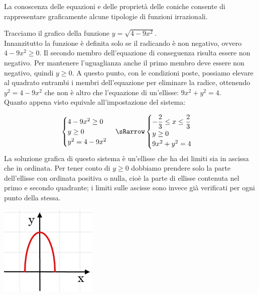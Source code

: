 La conoscenza delle equazioni e delle proprietà delle coniche consente di 
rappresentare graficamente alcune tipologie di funzioni irrazionali.\\
\begin{esempio} Tracciamo il grafico della funzione 
\(y=\sqrt{4-9x^{2}}\).\\[7pt] Innanzitutto la funzione è definita solo se il 
radicando è non negativo, ovvero \(4-9x^{2}\geq0\). Il secondo membro 
dell'equazione di conseguenza risulta essere non negativo. Per mantenere l'uguaglianza 
anche il primo membro deve essere non negativo, quindi \( y\geq 0 \). 
A questo punto, con le condizioni poste, possiamo elevare al quadrato entrambi i membri dell'equazione
per eliminare la radice, ottenendo \( y^{2}=4-9x^{2} \) che non è altro che 
l'equazione di un'ellisse: \( 9x^{2}+y^{2}=4 \).
\\[5pt]
Quanto appena visto equivale all'impostazione del sistema:\\[7pt]
\noindent \begin{minipage}{.7\textwidth}
\[\begin{cases}  4-9x^{2}\geq 0   \\ y\geq0  \\y^{2}=4-9x^{2} 
\end{cases} \sRarrow
\begin{cases}   -\dfrac{2}{3}\leq x\leq \dfrac{2}{3}   \\ y\geq0  \\ 
9x^{2}+y^{2}=4 \end{cases}\] 
La soluzione grafica di questo sistema è un'ellisse che ha 
dei limiti sia in ascissa che in ordinata. Per tener conto di \( y\geq0 \) 
dobbiamo prendere solo la parte dell'ellisse con ordinata positiva o nulla, 
cioè la parte di ellisse contenuta nel primo e secondo quadrante; i limiti sulle ascisse
sono invece già verificati per ogni punto della stessa.
  \end{minipage}
  \hspace{.7cm}
  \begin{minipage}{.3\textwidth}
    \includegraphics[width=.85\textwidth]{img/curva1.jpg}

\end{minipage}
\end{esempio}

